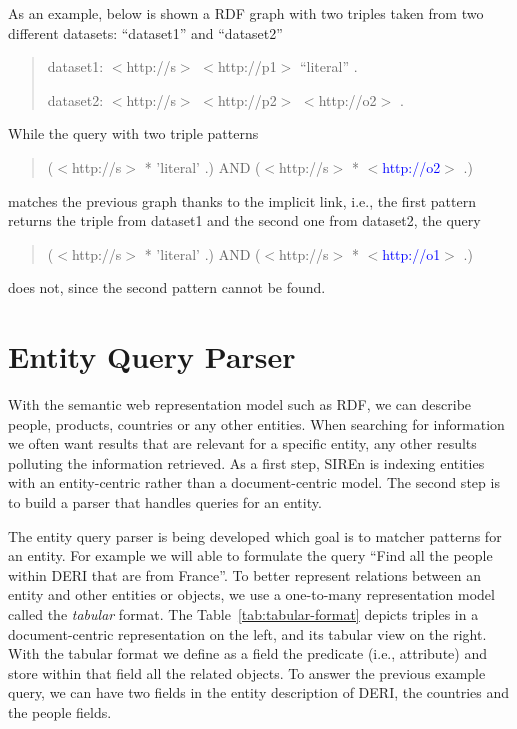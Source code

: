 As an example, below is shown a RDF graph with two triples taken from two
different datasets: ``dataset1'' and ``dataset2''
\begin{quotation}
dataset1: $<$http://s$>$ $<$http://p1$>$ ``literal'' .

dataset2: $<$http://s$>$ $<$http://p2$>$ $<$http://o2$>$ .
\end{quotation}
While the query with two triple patterns
\begin{quotation}
($<$http://s$>$ * 'literal' .) AND ($<$http://s$>$ *
$<$\textcolor{blue}{http://o2}$>$ .)
\end{quotation}
matches the previous graph thanks to the implicit link, i.e., the first pattern
returns the triple from dataset1 and the second one from dataset2, the query
\begin{quotation}
($<$http://s$>$ * 'literal' .) AND ($<$http://s$>$ *
$<$\textcolor{blue}{http://o1}$>$ .)
\end{quotation}
does not, since the second pattern cannot be found.

\section{Entity Query Parser}
\label{sec:ent-qparser}

With the semantic web representation model such as RDF, we can describe people,
products, countries or any other entities. When searching for information we
often want results that are relevant for a specific entity, any other results
polluting the information retrieved. As a first step, SIREn is indexing
entities with an entity-centric rather than a document-centric model. The
second step is to build a parser that handles queries for an entity.

The entity query parser is being developed which goal is to matcher patterns for
an entity. For example we will able to formulate the query ``Find all the
people within DERI that are from France''. To better represent relations
between an entity and other entities or objects, we use a one-to-many
representation model called the \emph{tabular} format. The
Table~\ref{tab:tabular-format} depicts triples in a document-centric
representation on the left, and its tabular view on the right. With the tabular
format we define as a field the predicate (i.e., attribute) and store within
that field all the related objects. To answer the previous example query, we
can have two fields in the entity description of DERI, the countries and the
people fields.

